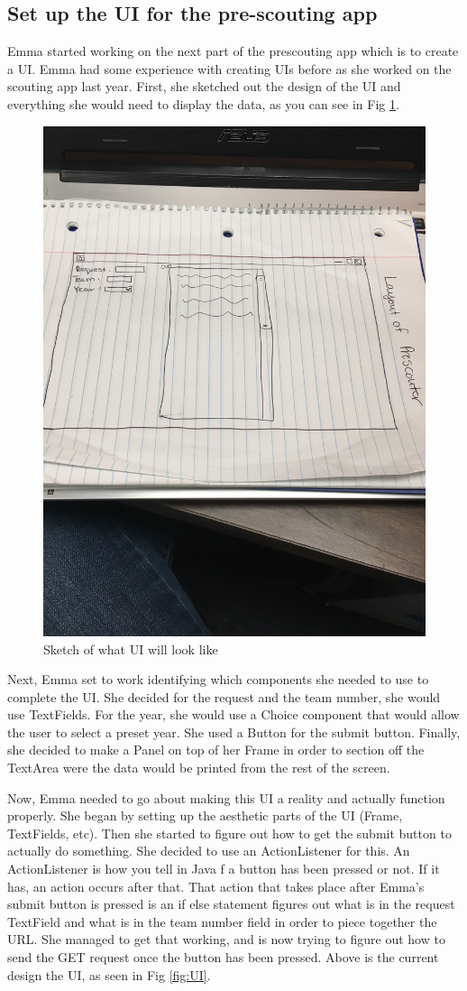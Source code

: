 \documentclass{article}
\begin{document}
\subsection{Set up the UI for the pre-scouting app}
Emma started working on the next part of the prescouting app which is to create a UI. Emma had some experience with creating UIs before as she worked on the scouting app last year. First, she sketched out the design of the UI and everything she would need to display the data, as you can see in Fig \ref{fig:sketch}. 

\begin{figure}
    \centering
    \includegraphics[width=.6 \textwidth]{24_02-11/images/sketchofUI.JPG}
    \caption{Sketch of what UI will look like}
    \label{fig:sketch}
\end{figure}

Next, Emma set to work identifying which components she needed to use to complete the UI. She decided for the request and the team number, she would use TextFields. For the year, she would use a Choice component that would allow the user to select a preset year. She used a Button for the submit button. Finally, she decided to make a Panel on top of her Frame in order to section off the TextArea were the data would be printed from the rest of the screen. 

Now, Emma needed to go about making this UI a reality and actually function properly. She began by setting up the aesthetic parts of the UI (Frame, TextFields, etc). Then she started to figure out how to get the submit button to actually do something. She decided to use an ActionListener for this. An ActionListener is how you tell in Java f a button has been pressed or not. If it has, an action occurs after that. That action that takes place after Emma's submit button is pressed is an if else statement figures out what is in the request TextField and what is in the team number field in order to piece together the URL. She managed to get that working, and is now trying to figure out how to send the GET request once the button has been pressed. Above is the current design the UI, as seen in Fig \ref{fig:UI}.
\end{document}
